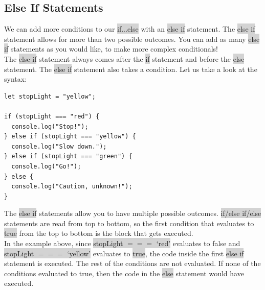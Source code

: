 \documentclass[11pt]{article}
\begin{document}
\subsection{Else If Statements}
We can add more conditions to our \colorbox{lightgray}{if...else} with an \colorbox{lightgray}{else if} statement. The \colorbox{lightgray}{else if} statement allows for more than two possible outcomes. You can add as many \colorbox{lightgray}{else if} statements as you would like, to make more complex conditionals! \\
\newline
The \colorbox{lightgray}{else if} statement always comes after the \colorbox{lightgray}{if} statement and before the \colorbox{lightgray}{else} statement. The \colorbox{lightgray}{else if} statement also takes a condition. Let us take a look at the syntax:
\begin{lstlisting}
let stopLight = "yellow";

if (stopLight === "red") {
  console.log("Stop!");
} else if (stopLight === "yellow") {
  console.log("Slow down.");
} else if (stopLight === "green") {
  console.log("Go!");
} else {
  console.log("Caution, unknown!");
}
\end{lstlisting}
The \colorbox{lightgray}{else if} statements allow you to have multiple possible outcomes. \colorbox{lightgray}{if/else if/else} statements are read from top to bottom, so the first condition that evaluates to \colorbox{lightgray}{true} from the top to bottom is the block that gets executed. \\
\newline
In the example above, since \colorbox{lightgray}{stopLight $=$$=$$=$ `red'} evaluates to false and \colorbox{lightgray}{stopLight $=$$=$$=$ `yellow'} evaluates to \colorbox{lightgray}{true}, the code inside the first \colorbox{lightgray}{else if} statement is executed. The rest of the conditions are not evaluated. If none of the conditions evaluated to true, then the code in the \colorbox{lightgray}{else} statement would have executed.
\end{document}
